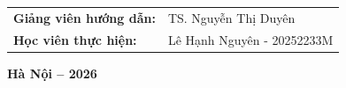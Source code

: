 \begin{titlepage}
    \vspace{2.0cm}
    
    \begin{flushleft}
        \hspace{2.5cm} 
        \begin{tabular}{ll}
            \fontsize{12}{14}\selectfont\textbf{Giảng viên hướng dẫn:} & \fontsize{12}{14}\selectfont TS. Nguyễn Thị Duyên \\
            \fontsize{12}{14}\selectfont\textbf{Học viên thực hiện:} & \fontsize{12}{14}\selectfont Lê Hạnh Nguyên - 20252233M
        \end{tabular}
    \end{flushleft}
    
    \vfill
    
    {\fontsize{12}{14}\selectfont\textbf{Hà Nội – 2026}\\}
    \vspace*{0.4cm}
    
\end{titlepage}
